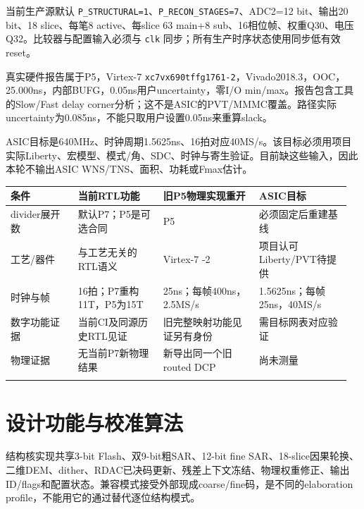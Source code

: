 \documentclass[UTF8,fontset=fandol,10pt,a4paper,openany]{ctexrep}
\newcommand{\code}[1]{\nolinkurl{#1}}
\begin{document}
当前生产源默认 \code{P_STRUCTURAL=1}、\code{P_RECON_STAGES=7}、ADC2=12 bit、输出20 bit、18 slice、每笔8 active、每slice 63 main+8 sub、16相位帧、权重Q30、电压Q32。比较器与配置输入必须与 \code{clk} 同步；所有生产时序状态使用同步低有效reset。


真实硬件报告属于P5，Virtex-7 \code{xc7vx690tffg1761-2}，Vivado2018.3，OOC，25.000ns，内部BUFG，0.05ns用户uncertainty，零I/O min/max。报告包含工具的Slow/Fast delay corner分析；这不是ASIC的PVT/MMMC覆盖。路径实际uncertainty为0.085ns，不能只取用户设置0.05ns来重算slack。


ASIC目标是640MHz、时钟周期1.5625ns、16拍对应40MS/s。该目标必须用项目实际Liberty、宏模型、模式/角、SDC、时钟与寄生验证。目前缺这些输入，因此本轮不输出ASIC WNS/TNS、面积、功耗或Fmax估计。


\begingroup\small\setlength{\tabcolsep}{2pt}\renewcommand{\arraystretch}{1.25}\begin{longtable}{@{}>{\raggedright\arraybackslash}p{0.19\linewidth}>{\raggedright\arraybackslash}p{0.24\linewidth}>{\raggedright\arraybackslash}p{0.27\linewidth}>{\raggedright\arraybackslash}p{0.26\linewidth}@{}}
\toprule
\textbf{条件} & \textbf{当前RTL功能} & \textbf{旧P5物理实现重开} & \textbf{ASIC目标}\\\midrule\endhead
divider展开数 & 默认P7；P5是可选合同 & P5 & 必须固定后重建基线\\\addlinespace[2pt]
工艺/器件 & 与工艺无关的RTL语义 & Virtex-7 -2 & 项目认可Liberty/PVT待提供\\\addlinespace[2pt]
时钟与帧 & 16拍；P7重构11T，P5为15T & 25ns；每帧400ns，2.5MS/s & 1.5625ns；每帧25ns，40MS/s\\\addlinespace[2pt]
数字功能证据 & 当前CI及同源历史RTL见证 & 旧完整映射功能见证另有身份 & 需目标网表对应验证\\\addlinespace[2pt]
物理证据 & 无当前P7新物理结果 & 新导出同一个旧routed DCP & 尚未测量\\\addlinespace[2pt]
\bottomrule\end{longtable}\endgroup


\section{设计功能与校准算法}


结构核实现共享3-bit Flash、双9-bit粗SAR、12-bit fine SAR、18-slice因果轮换、二维DEM、dither、RDAC已决码更新、残差上下文冻结、物理权重修正、输出ID/flags和配置状态。兼容模式接受外部现成coarse/fine码，是不同的elaboration profile，不能用它的通过替代逐位结构模式。
\end{document}

